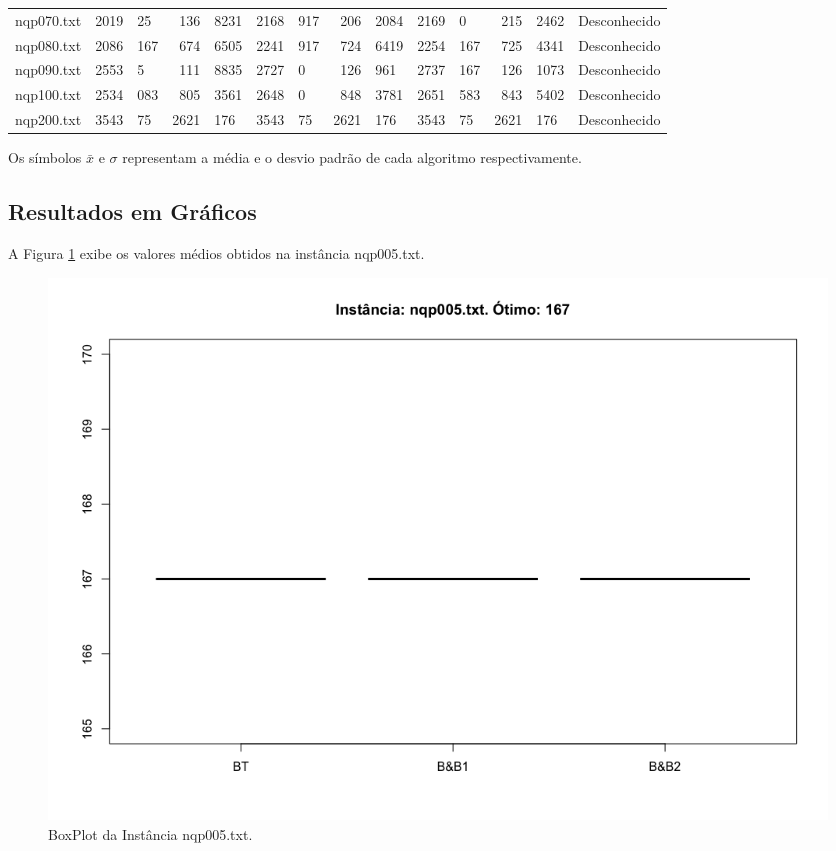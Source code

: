 \documentclass[12pt]{article}
\begin{document}
\begin{table}[H]
{\begin{tabular}{c||r@{.}lr@{.}l|r@{.}lr@{.}l|r@{.}lr@{.}l||c}
					nqp070.txt & 2019        & 25            &  136     & 8231           & 2168        & 917                  &  206      & 2084            & 2169 & 0                       &  215      & 2462         & Desconhecido \\
					nqp080.txt & 2086        & 167           &  674     & 6505           & 2241        & 917                  &  724      & 6419            & 2254 & 167                     &  725      & 4341         & Desconhecido \\
					nqp090.txt & 2553        & 5             &  111     & 8835           & 2727        & 0                    &  126      & 961             & 2737 & 167                     &  126      & 1073         & Desconhecido \\
					nqp100.txt & 2534        & 083           &  805     & 3561           & 2648        & 0                    &  848      & 3781            & 2651 & 583                     &  843      & 5402         & Desconhecido \\
					nqp200.txt & 3543        & 75            &  2621    & 176            & 3543        & 75                   &  2621     & 176             & 3543 & 75                      &  2621     & 176          & Desconhecido \\ \hline
				\end{tabular}
			}
		\end{table}

		Os símbolos $ \bar{x} $ e $ \sigma $ representam a média e o desvio padrão de cada algoritmo respectivamente.


	\subsection{Resultados em Gráficos}

	A Figura \ref{fig:5} exibe os valores médios obtidos na instância nqp005.txt.

	\begin{figure}[H]
		\centering
		\includegraphics[width=0.9\linewidth]{img/5}
		\caption{BoxPlot da Instância nqp005.txt.}
		\label{fig:5}
	\end{figure}
\end{document}
